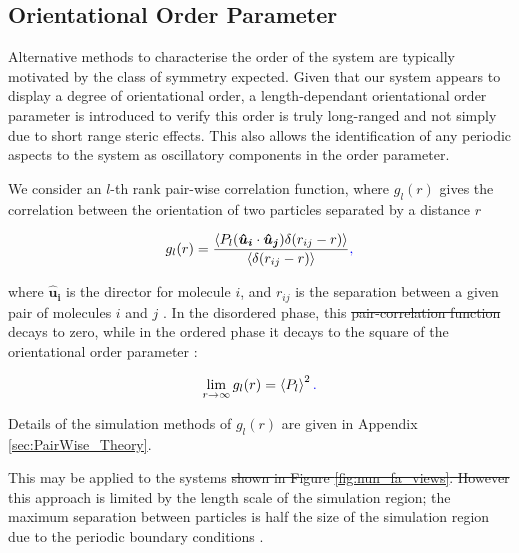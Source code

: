 \documentclass[11pt, a4paper]{article} %
\providecommand{\DIFadd}[1]{{\protect\color{blue}\uwave{#1}}} %
\providecommand{\DIFdel}[1]{{\protect\color{red}\sout{#1}}}                      %
\providecommand{\DIFaddbegin}{} %
\providecommand{\DIFaddend}{} %
\providecommand{\DIFdelbegin}{} %
\providecommand{\DIFdelend}{} %
\begin{document}
\subsection{Orientational Order Parameter} \label{sec:PairWise_Application}
Alternative methods to characterise the order of the system are typically motivated by the class of symmetry expected. Given that our system appears to display a degree of orientational order, a length-dependant orientational order parameter is introduced to verify this order is truly long-ranged and not simply due to short range steric effects. This also allows the identification of any periodic aspects to the system as oscillatory components in the order parameter.

We consider an $l$-th rank pair-wise correlation function, where $g_{l}(r)$ gives the correlation between the orientation of two particles separated by a distance $r$

\begin{equation} \label{eq:PairWise_eq}
g_{l}(r) = \frac{\langle P_{l}(\boldsymbol{\hat{u}_{i}}\cdot \boldsymbol{\hat{u}_{j}}) \delta(r_{ij}-r)\rangle}{\langle  \delta(r_{ij}-r) \rangle}\DIFaddbegin \DIFadd{,
}\DIFaddend \end{equation}

where $\boldsymbol{\hat{u}_{i}}$ is the director for molecule $i$, and $r_{ij}$ is the separation between a given pair of molecules $i$ and $j$ \cite{Zannoni1979}. In the disordered phase, this \DIFdelbegin \DIFdel{pair-correlation function }\DIFdelend \DIFaddbegin \DIFadd{\textcolor{forestgreen}{pair-correlation function} }\DIFaddend decays to zero, while in the ordered phase it decays to the square of the orientational order parameter \cite{Frenkel1985b}:

\begin{equation}
\lim_{r \to \infty}g_{l}(r) = \left\langle P_{l} \right\rangle ^{2}\DIFaddbegin \DIFadd{.
}\DIFaddend \end{equation}

Details of the simulation methods of $g_{l}(r)$ are given in Appendix \ref{sec:PairWise_Theory}. 

This may be applied to the systems \DIFdelbegin \DIFdel{shown in Figure \ref{fig:nun_fa_views}. However }\DIFdelend \DIFaddbegin \DIFadd{\textcolor{forestgreen}{shown in Figure \ref{fig:nun_fa_views}. However,} }\DIFaddend this approach is limited by the length scale of the simulation region; the maximum separation between particles is half the size of the simulation region due to the periodic boundary conditions \cite{Frenkel1985c}.
\end{document}
